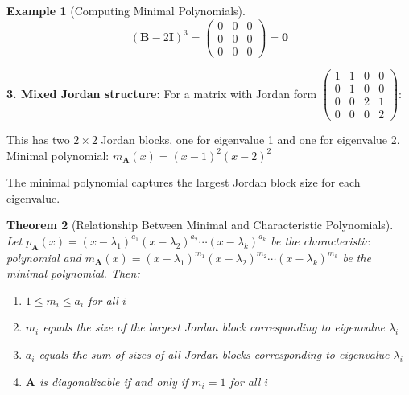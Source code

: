 \documentclass[12pt]{article}
\numberwithin{equation}{section}
\newcommand{\mat}[1]{\mathbf{#1}}        %
\theoremstyle{plain}
\newtheorem{theorem}{Theorem}[section]
\theoremstyle{definition}
\newtheorem{example}[theorem]{Example}
\theoremstyle{remark}
\begin{document}
\begin{example}[Computing Minimal Polynomials]
$$(\mat{B} - 2\mat{I})^3 = \begin{pmatrix} 0 & 0 & 0 \\ 0 & 0 & 0 \\ 0 & 0 & 0 \end{pmatrix} = \mat{0}$$ \checkmark

\textbf{3. Mixed Jordan structure:}
For a matrix with Jordan form $\begin{pmatrix} 1 & 1 & 0 & 0 \\ 0 & 1 & 0 & 0 \\ 0 & 0 & 2 & 1 \\ 0 & 0 & 0 & 2 \end{pmatrix}$:

This has two $2 \times 2$ Jordan blocks, one for eigenvalue 1 and one for eigenvalue 2.
Minimal polynomial: $m_{\mat{A}}(x) = (x - 1)^2(x - 2)^2$

The minimal polynomial captures the largest Jordan block size for each eigenvalue.
\end{example}

\begin{theorem}[Relationship Between Minimal and Characteristic Polynomials]
Let $p_{\mat{A}}(x) = (x - \lambda_1)^{a_1}(x - \lambda_2)^{a_2} \cdots (x - \lambda_k)^{a_k}$ be the characteristic polynomial and $m_{\mat{A}}(x) = (x - \lambda_1)^{m_1}(x - \lambda_2)^{m_2} \cdots (x - \lambda_k)^{m_k}$ be the minimal polynomial. Then:
\begin{enumerate}
\item $1 \leq m_i \leq a_i$ for all $i$
\item $m_i$ equals the size of the largest Jordan block corresponding to eigenvalue $\lambda_i$
\item $a_i$ equals the sum of sizes of all Jordan blocks corresponding to eigenvalue $\lambda_i$
\item $\mat{A}$ is diagonalizable if and only if $m_i = 1$ for all $i$
\end{enumerate}
\end{theorem}
\end{document}

